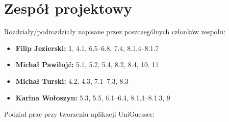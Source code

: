 \chapter{Zespół projektowy}
\label{chap:work_distribution}

\noindent
Rozdziały/podrozdziały napisane przez poszczególnych członków zespołu:
\smallskip
\begin{itemize}
  \item \textbf{Filip Jezierski:} 1, 4.1, 6.5--6.8, 7.4, 8.1.4--8.1.7
  \item \textbf{Michał Pawiłojć:} 5.1, 5.2, 5.4, 8.2, 8.4, 10, 11
  \item \textbf{Michał Turski:} 4.2, 4.3, 7.1--7.3, 8.3
  \item \textbf{Karina Wołoszyn:} 5.3, 5.5, 6.1--6.4, 8.1.1--8.1.3, 9
\end{itemize}

\bigskip
\noindent
Podział prac przy tworzeniu aplikacji UniGuesser:

